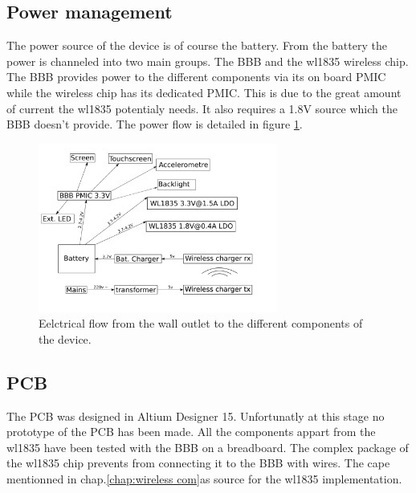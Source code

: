 
\subsection{Power management}

The power source of the device is of course the battery. From the battery the power is channeled into two main groups. The BBB and the wl1835 wireless chip. The BBB provides power to the different components via its on board PMIC while the wireless chip has its dedicated PMIC. This is due to the great amount of current the wl1835 potentialy needs. It also requires a 1.8V source which the BBB doesn't provide. The power flow is detailed in figure \ref{fig:power flow}.

\begin{figure}[!ht]
    \centering
    \includegraphics[width=0.7\textwidth,keepaspectratio]{chap/hardFig/vesta_power_management}
    \caption{Eelctrical flow from the wall outlet to the different components of the device.}
    \label{fig:power flow}
\end{figure}




\subsection{PCB}
\label{chap:pcb}
The PCB was designed in Altium Designer 15. Unfortunatly at this stage no prototype of the PCB has been made. All the components appart from the wl1835 have been tested with the BBB on a breadboard. The complex package of the wl1835 chip prevents from connecting it to the BBB with wires. The cape mentionned in chap.\ref{chap:wireless com}as source for the wl1835 implementation.

